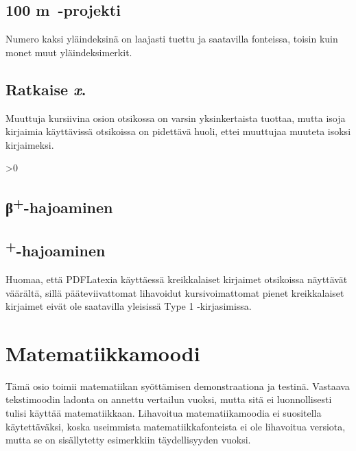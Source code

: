 \documentclass[globalnumbering,centeredcaptions,draftfooter]{tutthesis/tutthesis} %
\begin{document}
\subsection{100 m\texttwosuperior\ -projekti}

Numero kaksi yläindeksinä on laajasti tuettu ja saatavilla fonteissa, toisin kuin monet muut yläindeksimerkit.

\newcommand*{\varx}{x}
\subsection{Ratkaise \textit{\protect\varx}.} %

Muuttuja kursiivina osion otsikossa on varsin yksinkertaista tuottaa, mutta isoja kirjaimia käyttävissä otsikoissa on pidettävä huoli, ettei muuttujaa muuteta isoksi kirjaimeksi.

\newcommand*{\plussuperior}{\textsuperscript{+}}

\fi{}\fi>0
  \newcommand*{\tbeta}{β}
  \subsection{\protect\tbeta\plussuperior-hajoaminen} %
\else\ifx\textgreekfontmap\undefined\else
  \subsection{\protect\textbeta\plussuperior-hajoaminen}
  Huomaa, että PDFLatexia käyttäessä kreikkalaiset kirjaimet otsikoissa näyttävät väärältä, sillä pääteviivattomat lihavoidut kursivoimattomat pienet kreikkalaiset kirjaimet eivät ole saatavilla yleisissä Type 1 -kirjasimissa.
\fi\fi


\section{Matematiikkamoodi}

Tämä osio toimii matematiikan syöttämisen demonstraationa ja testinä.
Vastaava tekstimoodin ladonta on annettu vertailun vuoksi, mutta sitä ei luonnollisesti tulisi käyttää matematiikkaan.
Lihavoitua matematiikamoodia ei suositella käytettäväksi, koska useimmista matematiikkafonteista ei ole lihavoitua versiota, mutta se on sisällytetty esimerkkiin täydellisyyden vuoksi.
\end{document}
